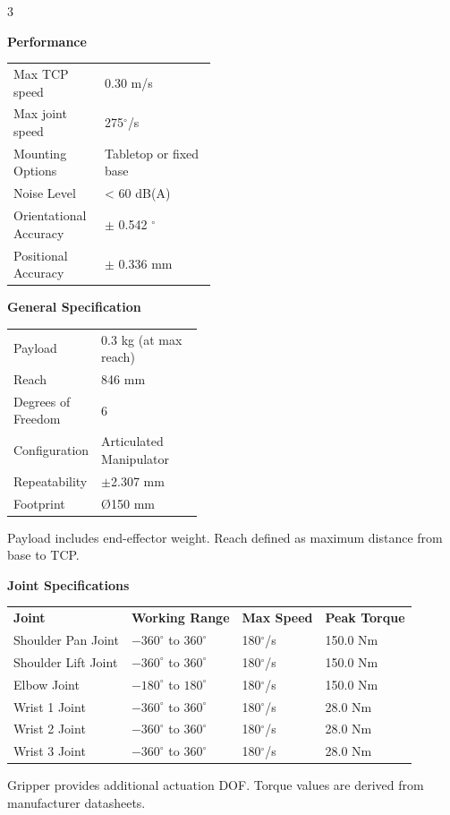 \documentclass[a4paper,landscape,10pt]{article}
\newcommand{\sectitle}[1]{
    \vspace{0.4cm}
    \colorbox{rowcolor}{
        \parbox{\linewidth}{
            \textbf{\textcolor{maincolor}{#1}}
        }
    }
    \vspace{0.2cm}
}
\begin{document}
\begin{multicols}{3}
\sectitle{Performance}

\colorbox{rowcolor}{
\parbox{\linewidth}{
\begin{tabularx}{\linewidth}{>{\raggedright\arraybackslash}p{0.45\linewidth} X}
Max TCP speed & 0.30 m/s \\
Max joint speed & 275$^\circ$/s \\
Mounting Options & Tabletop or fixed base\\
Noise Level & < 60 dB(A) \\
Orientational Accuracy & $\pm$ 0.542 $^\circ$\\
Positional Accuracy & $\pm$ 0.336 mm\\
\end{tabularx}
}
}

\vfill\null
\columnbreak

\sectitle{General Specification}

\colorbox{rowcolor}{
\parbox{\linewidth}{
\begin{tabularx}{\linewidth}{>{\raggedright\arraybackslash}p{0.42\linewidth} X}
Payload & 0.3 kg (at max reach) \\
Reach & 846 mm\\
Degrees of Freedom & 6 \\
Configuration & Articulated Manipulator \\
Repeatability & $\pm$2.307 mm \\
Footprint & Ø150 mm \\
\end{tabularx}
}
}
\smallskip
{\footnotesize *Payload includes end-effector weight. Reach defined as maximum distance from base to TCP.}

\sectitle{Joint Specifications}

\colorbox{rowcolor}{
\parbox{\linewidth}{
\begin{tabularx}{\linewidth}{l X X X}
\textbf{Joint} & \textbf{Working Range} & \textbf{Max Speed} & \textbf{Peak Torque} \\
Shoulder Pan Joint & $-360^\circ$ to $360^\circ$ & 180$^\circ$/s & 150.0 Nm \\
Shoulder Lift Joint & $-360^\circ$ to $360^\circ$ & 180$^\circ$/s & 150.0 Nm \\
Elbow Joint & $-180^\circ$ to $180^\circ$ & 180$^\circ$/s & 150.0 Nm \\
Wrist 1 Joint & $-360^\circ$ to $360^\circ$ & 180$^\circ$/s & 28.0 Nm \\
Wrist 2 Joint & $-360^\circ$ to $360^\circ$ & 180$^\circ$/s & 28.0 Nm \\
Wrist 3 Joint & $-360^\circ$ to $360^\circ$ & 180$^\circ$/s & 28.0 Nm \\
\end{tabularx}
}
}
\smallskip
{\footnotesize *Gripper provides additional actuation DOF. Torque values are derived from manufacturer datasheets.}


\end{multicols}
\end{document}
